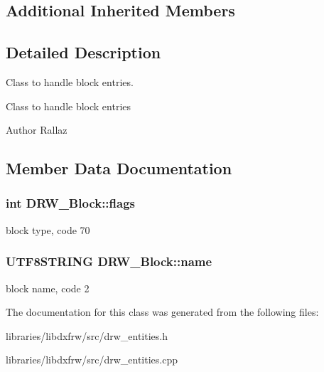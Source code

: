 \subsection*{Additional Inherited Members}


\subsection{Detailed Description}
Class to handle block entries. 

Class to handle block entries \begin{DoxyAuthor}{Author}
Rallaz 
\end{DoxyAuthor}


\subsection{Member Data Documentation}
\hypertarget{classDRW__Block_a17bb4c01376f4b30b8d3ce36863b3ae3}{
\subsubsection[{flags}]{\setlength{\rightskip}{0pt plus 5cm}int D\-R\-W\-\_\-\-Block\-::flags}}\label{classDRW__Block_a17bb4c01376f4b30b8d3ce36863b3ae3}
block type, code 70 \hypertarget{classDRW__Block_a574a37d634655f8ea5526a80e842a66a}{
\subsubsection[{name}]{\setlength{\rightskip}{0pt plus 5cm}U\-T\-F8\-S\-T\-R\-I\-N\-G D\-R\-W\-\_\-\-Block\-::name}}\label{classDRW__Block_a574a37d634655f8ea5526a80e842a66a}
block name, code 2 

The documentation for this class was generated from the following files\-:\begin{DoxyCompactItemize}
\item 
libraries/libdxfrw/src/drw\-\_\-entities.\-h\item 
libraries/libdxfrw/src/drw\-\_\-entities.\-cpp\end{DoxyCompactItemize}

